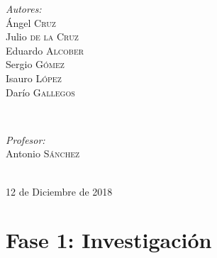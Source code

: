 \documentclass[12pt]{article}
\begin{document}
\begin{titlepage}

\begin{minipage}{0.4\textwidth}
\begin{flushleft} \large
\emph{Autores:}\\
Ángel \textsc{Cruz} \\ %
Julio \textsc{de la Cruz} \\
Eduardo \textsc{Alcober}\\
Sergio \textsc{Gómez}\\
Isauro \textsc{López}\\
Darío \textsc{Gallegos}
\end{flushleft}
\end{minipage}
~
\begin{minipage}{0.4\textwidth}
\begin{flushright} \large
\emph{Profesor:} \\
Antonio \textsc{Sánchez} %
\end{flushright}
\end{minipage}\\[0.85cm]


{\large 12 de Diciembre de 2018}\\[0.5cm] %



\vfill %

\end{titlepage}



\tableofcontents %

\newpage

\section{Fase 1: Investigación}
\end{document}
